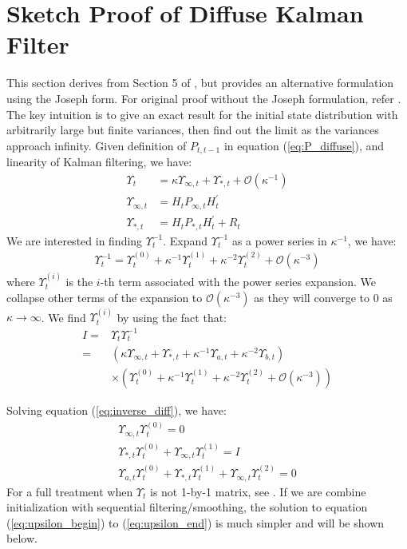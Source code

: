 \documentclass[12pt]{article}
\numberwithin{equation}{section}
\begin{document}
\section{Sketch Proof of Diffuse Kalman Filter} \label{ap:init_filter}
This section derives from Section 5 of \cite{durbin_koopman_2001}, but provides an alternative formulation using the Joseph form. For original proof without the Joseph formulation, refer \cite{durbin_koopman_2001}. The key intuition is to give an exact result for the initial state distribution with arbitrarily large but finite variances, then find out the limit as the variances approach infinity. Given definition of $P_{t,t-1}$ in equation (\ref{eq:P_diffuse}), and linearity of Kalman filtering, we have:
\begin{align*}
    \Upsilon_t &= \kappa \Upsilon_{\infty,t} + \Upsilon_{*,t} + \mathcal{O}(\kappa^{-1}) \\
    \Upsilon_{\infty,t} &= H_tP_{\infty,t}H_t^{'} \\ 
    \Upsilon_{*,t} &= H_tP_{*,t}H_t^{'} + R_t
\end{align*}
We are interested in finding $\Upsilon_t^{-1}$. Expand $\Upsilon_t^{-1}$ as a power series in $\kappa^{-1}$, we have:
\begin{align*}
    \Upsilon_t^{-1} = \Upsilon_t^{(0)} + \kappa^{-1}\Upsilon_t^{(1)} + \kappa^{-2}\Upsilon_t^{(2)}+\mathcal{O}(\kappa^{-3})
\end{align*}
where $\Upsilon_t^{(i)}$ is the $i$-th term associated with the power series expansion. We collapse other terms of the expansion to $\mathcal{O}(\kappa^{-3})$ as they will converge to 0 as $\kappa \rightarrow \infty$. We find $\Upsilon_t^{(i)}$ by using the fact that: 
\begin{align}
    I =& \Upsilon_t\Upsilon_t^{-1} \nonumber \\
    =& (\kappa \Upsilon_{\infty,t} + \Upsilon_{*,t} + \kappa^{-1}\Upsilon_{a,t} + \kappa^{-2}\Upsilon_{b,t}) \nonumber \\
    &\times (\Upsilon_t^{(0)} + \kappa^{-1}\Upsilon_t^{(1)} + \kappa^{-2}\Upsilon_t^{(2)}+\mathcal{O}(\kappa^{-3})) \label{eq:inverse_diff}
\end{align}

Solving equation (\ref{eq:inverse_diff}), we have:
\begin{align}
    \Upsilon_{\infty,t}\Upsilon_t^{(0)} = 0 \label{eq:upsilon_begin} \\
    \Upsilon_{*,t}\Upsilon_t^{(0)} + \Upsilon_{\infty,t}\Upsilon_t^{(1)} = I \\
    \Upsilon_{a,t}\Upsilon_t^{(0)} + \Upsilon_{*,t}\Upsilon_t^{(1)} + \Upsilon_{\infty,t}\Upsilon_t^{(2)} = 0 \label{eq:upsilon_end}
\end{align}
For a full treatment when $\Upsilon_t$ is not 1-by-1 matrix, see \cite{koopman_1997}. If we are combine initialization with sequential filtering/smoothing, the solution to equation (\ref{eq:upsilon_begin}) to (\ref{eq:upsilon_end}) is much simpler and will be shown below.
\end{document}
